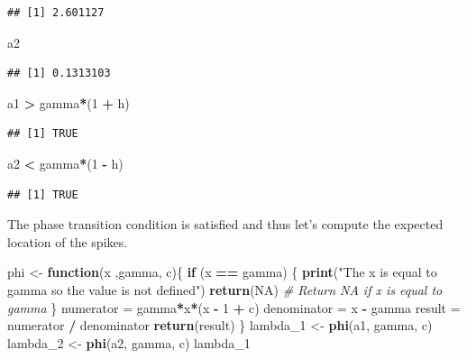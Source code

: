 \documentclass[
]{article}
\newenvironment{Shaded}{\begin{snugshade}}{\end{snugshade}}
\newcommand{\CommentTok}[1]{\textcolor[rgb]{0.56,0.35,0.01}{\textit{#1}}}
\newcommand{\ConstantTok}[1]{\textcolor[rgb]{0.56,0.35,0.01}{#1}}
\newcommand{\ControlFlowTok}[1]{\textcolor[rgb]{0.13,0.29,0.53}{\textbf{#1}}}
\newcommand{\DecValTok}[1]{\textcolor[rgb]{0.00,0.00,0.81}{#1}}
\newcommand{\FunctionTok}[1]{\textcolor[rgb]{0.13,0.29,0.53}{\textbf{#1}}}
\newcommand{\NormalTok}[1]{#1}
\newcommand{\OtherTok}[1]{\textcolor[rgb]{0.56,0.35,0.01}{#1}}
\newcommand{\SpecialCharTok}[1]{\textcolor[rgb]{0.81,0.36,0.00}{\textbf{#1}}}
\newcommand{\StringTok}[1]{\textcolor[rgb]{0.31,0.60,0.02}{#1}}
\begin{document}
\begin{verbatim}
## [1] 2.601127
\end{verbatim}

\begin{Shaded}
\begin{Highlighting}[]
\NormalTok{a2}
\end{Highlighting}
\end{Shaded}

\begin{verbatim}
## [1] 0.1313103
\end{verbatim}

\begin{Shaded}
\begin{Highlighting}[]
\NormalTok{a1 }\SpecialCharTok{\textgreater{}}\NormalTok{ gamma}\SpecialCharTok{*}\NormalTok{(}\DecValTok{1} \SpecialCharTok{+}\NormalTok{ h)}
\end{Highlighting}
\end{Shaded}

\begin{verbatim}
## [1] TRUE
\end{verbatim}

\begin{Shaded}
\begin{Highlighting}[]
\NormalTok{a2 }\SpecialCharTok{\textless{}}\NormalTok{ gamma}\SpecialCharTok{*}\NormalTok{(}\DecValTok{1} \SpecialCharTok{{-}}\NormalTok{ h)}
\end{Highlighting}
\end{Shaded}

\begin{verbatim}
## [1] TRUE
\end{verbatim}

The phase transition condition is satisfied and thus let's compute the
expected location of the spikes.

\begin{Shaded}
\begin{Highlighting}[]
\NormalTok{phi }\OtherTok{\textless{}{-}} \ControlFlowTok{function}\NormalTok{(x ,gamma, c)\{}
  \ControlFlowTok{if}\NormalTok{ (x }\SpecialCharTok{==}\NormalTok{ gamma) \{}
    \FunctionTok{print}\NormalTok{(}\StringTok{"The x is equal to gamma so the value is not defined"}\NormalTok{)}
    \FunctionTok{return}\NormalTok{(}\ConstantTok{NA}\NormalTok{)  }\CommentTok{\# Return NA if x is equal to gamma}
\NormalTok{  \}}
\NormalTok{  numerator }\OtherTok{=}\NormalTok{ gamma}\SpecialCharTok{*}\NormalTok{x}\SpecialCharTok{*}\NormalTok{(x }\SpecialCharTok{{-}} \DecValTok{1} \SpecialCharTok{+}\NormalTok{ c)}
\NormalTok{  denominator }\OtherTok{=}\NormalTok{ x }\SpecialCharTok{{-}}\NormalTok{ gamma}
\NormalTok{  result }\OtherTok{=}\NormalTok{ numerator }\SpecialCharTok{/}\NormalTok{ denominator}
  \FunctionTok{return}\NormalTok{(result)}
\NormalTok{\}}
\NormalTok{lambda\_1 }\OtherTok{\textless{}{-}} \FunctionTok{phi}\NormalTok{(a1, gamma, c)}
\NormalTok{lambda\_2 }\OtherTok{\textless{}{-}} \FunctionTok{phi}\NormalTok{(a2, gamma, c)}
\NormalTok{lambda\_1}
\end{Highlighting}
\end{Shaded}
\end{document}
